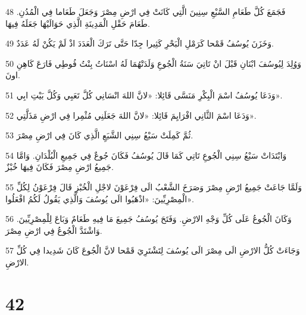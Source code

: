 \par 48 فَجَمَعَ كُلَّ طَعَامِ السَّبْعِ سِنِينَ الَّتِي كَانَتْ فِي ارْضِ مِصْرَ وَجَعَلَ طَعَاما فِي الْمُدُنِ. طَعَامَ حَقْلِ الْمَدِينَةِ الَّذِي حَوَالَيْهَا جَعَلَهُ فِيهَا.
\par 49 وَخَزَنَ يُوسُفُ قَمْحا كَرَمْلِ الْبَحْرِ كَثِيرا جِدّا حَتَّى تَرَكَ الْعَدَدَ اذْ لَمْ يَكُنْ لَهُ عَدَدٌ.
\par 50 وَوُلِدَ لِيُوسُفَ ابْنَانِ قَبْلَ انْ تَاتِيَ سَنَةُ الْجُوعِ وَلَدَتْهُمَا لَهُ اسْنَاتُ بِنْتُ فُوطِي فَارَعَ كَاهِنِ اونَ.
\par 51 وَدَعَا يُوسُفُ اسْمَ الْبِكْرِ مَنَسَّى قَائِلا: «لانَّ اللهَ انْسَانِي كُلَّ تَعَبِي وَكُلَّ بَيْتِ ابِي».
\par 52 وَدَعَا اسْمَ الثَّانِي افْرَايِمَ قَائِلا: «لانَّ اللهَ جَعَلَنِي مُثْمِرا فِي ارْضِ مَذَلَّتِي».
\par 53 ثُمَّ كَمِلَتْ سَبْعُ سِنِي الشَّبَعِ الَّذِي كَانَ فِي ارْضِ مِصْرَ.
\par 54 وَابْتَدَاتْ سَبْعُ سِنِي الْجُوعِ تَاتِي كَمَا قَالَ يُوسُفُ فَكَانَ جُوعٌ فِي جَمِيعِ الْبُلْدَانِ. وَامَّا جَمِيعُ ارْضِ مِصْرَ فَكَانَ فِيهَا خُبْزٌ.
\par 55 وَلَمَّا جَاعَتْ جَمِيعُ ارْضِ مِصْرَ وَصَرَخَ الشَّعْبُ الَى فِرْعَوْنَ لاجْلِ الْخُبْزِ قَالَ فِرْعَوْنُ لِكُلِّ الْمِصْرِيِّينَ: «اذْهَبُوا الَى يُوسُفَ وَالَّذِي يَقُولُ لَكُمُ افْعَلُوا».
\par 56 وَكَانَ الْجُوعُ عَلَى كُلِّ وَجْهِ الارْضِ. وَفَتَحَ يُوسُفُ جَمِيعَ مَا فِيهِ طَعَامٌ وَبَاعَ لِلْمِصْرِيِّينَ. وَاشْتَدَّ الْجُوعُ فِي ارْضِ مِصْرَ.
\par 57 وَجَاءَتْ كُلُّ الارْضِ الَى مِصْرَ الَى يُوسُفَ لِتَشْتَرِيَ قَمْحا لانَّ الْجُوعَ كَانَ شَدِيدا فِي كُلِّ الارْضِ.

\chapter{42}

